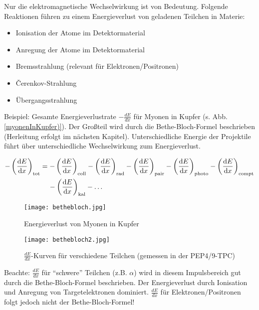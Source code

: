 \FloatBarrier

Nur die elektromagnetische Wechselwirkung ist von Bedeutung. Folgende Reaktionen führen zu einem
Energieverlust von geladenen Teilchen in Materie:

\begin{itemize}
  \item Ionisation der Atome im Detektormaterial
  \item Anregung der Atome im Detektormaterial
  \item Bremsstrahlung (relevant für Elektronen/Positronen)
  \item \v{C}erenkov-Strahlung
  \item Übergangsstrahlung
\end{itemize}

 
 Beispiel: Gesamte Energieverlustrate $-\frac{dE}{dx}$ für Myonen in Kupfer (s. Abb.
 \ref{myonenInKupfer)}). Der Großteil wird durch die Bethe-Bloch-Formel beschrieben (Herleitung
 erfolgt im nächsten Kapitel).
Unterschiedliche Energie der Projektile führt über unterschiedliche Wechselwirkung zum
Energieverlust.

\begin{align*}
-\left(\frac{\mathrm{d}E}{\mathrm{d}x}\right)_{\text{tot}} &= -\left(\frac{\mathrm{d}E}{\mathrm{d}x}\right)_{\text{coll}}
-\left(\frac{\mathrm{d}E}{\mathrm{d}x}\right)_{\text{rad}} -\left(\frac{\mathrm{d}E}{\mathrm{d}x}\right)_{\text{pair}}
-\left(\frac{\mathrm{d}E}{\mathrm{d}x}\right)_{\text{photo}} -\left(\frac{\mathrm{d}E}{\mathrm{d}x}\right)_{\text{compt}} \\
&\hspace{4mm} -\left(\frac{\mathrm{d}E}{\mathrm{d}x}\right)_{\text{kal}}-\ldots
\end{align*}
 
\begin{figure}
	\centering
	\texttt{[image: bethebloch.jpg]}
 	\caption{Energieverlust von Myonen in Kupfer}
 	\label{myonenInKupfer}
\end{figure}

\begin{figure}
	\centering
	\texttt{[image: bethebloch2.jpg]}
	\caption{$\frac{dE}{dx}$-Kurven für verschiedene Teilchen (gemessen in der
	PEP4/9-TPC)}
	\label{}
\end{figure}
 
 Beachte: $\frac{dE}{dx}$ für "`schwere"' Teilchen (z.B. $\alpha$) wird in diesem Impulsbereich gut
 durch die Bethe-Bloch-Formel beschrieben. Der Energieverlust durch Ionisation und Anregung von
 Targetelektronen dominiert. $\frac{dE}{dx}$ für Elektronen/Positronen folgt jedoch nicht der
 Bethe-Bloch-Formel!
 
 \FloatBarrier